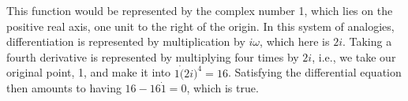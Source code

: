 This function would be represented by the complex number 1, which lies on the positive real axis, one unit
to the right of the origin.
In this system of analogies, differentiation is represented by multiplication by $i\omega$, which here is
$2i$. Taking a fourth derivative is represented by multiplying four times by $2i$, i.e., we
take our original point, 1, and make it into $1\dot (2i)^4=16$. Satisfying the differential equation
then amounts to having $16-16\dot 1=0$, which is true.
